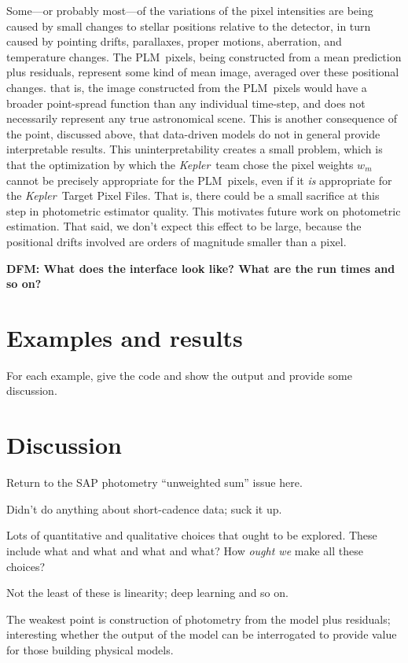 \documentclass[12pt, preprint]{aastex}
\newcommand{\project}[1]{\textsl{#1}}
\newcommand{\Kepler}{\project{Kepler}}
\newcommand{\name}{PLM}
\newcommand{\todo}[1]{\textbf{#1}}
\begin{document}
Some---or probably most---of the variations of the pixel intensities
  are being caused by small changes to stellar positions relative to the detector,
  in turn caused by pointing drifts, parallaxes, proper motions, aberration, and temperature changes.
The \name\ pixels, being constructed from a mean prediction plus residuals,
  represent some kind of mean image, averaged over these positional changes.
  that is, the image constructed from the \name\ pixels would have a broader
  point-spread function than any individual time-step,
  and does not necessarily represent any true astronomical scene.
This is another consequence of the point, discussed above,
  that data-driven models do not in general provide interpretable results.
This uninterpretability creates a small problem,
  which is that the optimization by which the \Kepler\ team chose the pixel weights $w_m$
  cannot be precisely appropriate for the \name\ pixels,
  even if it \emph{is} appropriate for the \Kepler\ Target Pixel Files.
That is, there could be a small sacrifice at this step in photometric estimator quality.
This motivates future work on photometric estimation.
That said, we don't expect this effect to be large,
  because the positional drifts involved are orders of magnitude smaller than a pixel.

\todo{DFM: What does the interface look like?  What are the run times and so on?}

\section{Examples and results}

For each example, give the code and show the output and provide some discussion.

\section{Discussion}

Return to the SAP photometry ``unweighted sum'' issue here.

Didn't do anything about short-cadence data; suck it up.

Lots of quantitative and qualitative choices that ought to be explored.
These include what and what and what and what?
How \emph{ought we} make all these choices?

Not the least of these is linearity; deep learning and so on.

The weakest point is construction of photometry from the model plus residuals;
  interesting whether the output of the model can be interrogated
  to provide value for those building physical models.
\end{document}
